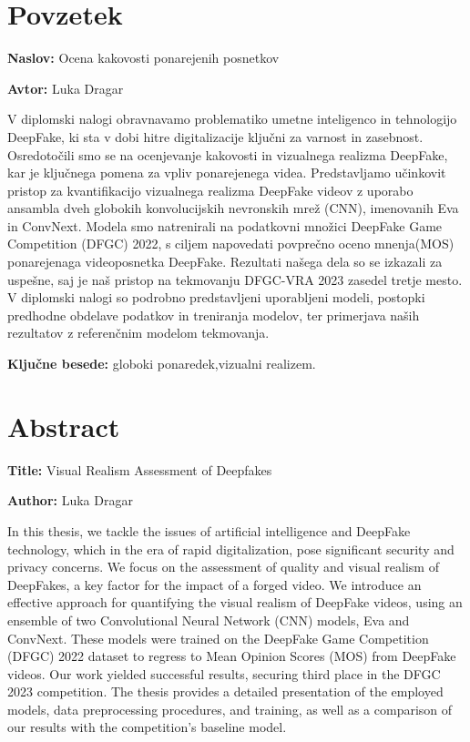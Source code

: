 \documentclass[a4paper,12pt,openright]{book}
\newcommand{\ttitle}{Ocena kakovosti ponarejenih posnetkov}
\newcommand{\ttitleEn}{Visual Realism Assessment of Deepfakes}
\newcommand{\tauthor}{Luka Dragar}
\newcommand{\tkeywords}{globoki ponaredek,vizualni realizem}
\newcommand{\clearemptydoublepage}{\newpage{\pagestyle{empty}\cleardoublepage}}
\begin{document}
\clearemptydoublepage

{}
\chapter*{Povzetek}

\noindent\textbf{Naslov:} \ttitle
\bigskip

\noindent\textbf{Avtor:} \tauthor
\bigskip

\noindent V diplomski nalogi obravnavamo problematiko umetne inteligenco in tehnologijo DeepFake, ki sta v dobi hitre digitalizacije ključni za varnost in zasebnost. Osredotočili smo se na ocenjevanje kakovosti in vizualnega realizma DeepFake, kar je ključnega pomena za vpliv ponarejenega videa. Predstavljamo učinkovit pristop za kvantifikacijo vizualnega realizma DeepFake videov z uporabo ansambla dveh globokih konvolucijskih nevronskih mrež (CNN), imenovanih Eva in ConvNext. Modela smo natrenirali na podatkovni množici DeepFake Game Competition (DFGC) 2022, s ciljem napovedati povprečno oceno mnenja(MOS) ponarejenaga videoposnetka DeepFake. Rezultati našega dela so se izkazali za uspešne, saj je naš pristop na tekmovanju DFGC-VRA 2023 zasedel tretje mesto. V diplomski nalogi so podrobno predstavljeni uporabljeni modeli, postopki predhodne obdelave podatkov in treniranja modelov, ter primerjava naših rezultatov z referenčnim modelom tekmovanja.

\bigskip

\noindent\textbf{Ključne besede:} \tkeywords.
\clearemptydoublepage

{}
\chapter*{Abstract}

\noindent\textbf{Title:} \ttitleEn
\bigskip

\noindent\textbf{Author:} \tauthor
\bigskip

\noindent In this thesis, we tackle the issues of artificial intelligence and DeepFake technology, which in the era of rapid digitalization, pose significant security and privacy concerns. We focus on the assessment of quality and visual realism of DeepFakes, a key factor for the impact of a forged video. We introduce an effective approach for quantifying the visual realism of DeepFake videos, using an ensemble of two Convolutional Neural Network (CNN) models, Eva and ConvNext. These models were trained on the DeepFake Game Competition (DFGC) 2022 dataset to regress to Mean Opinion Scores (MOS) from DeepFake videos. Our work yielded successful results, securing third place in the DFGC 2023 competition. The thesis provides a detailed presentation of the employed models, data preprocessing procedures, and training, as well as a comparison of our results with the competition's baseline model.
\bigskip
\end{document}
